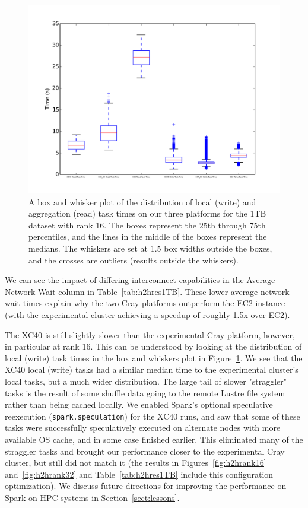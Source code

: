    \begin{figure} [H]
    \begin{centering}
    \includegraphics[scale=0.4]{images/boxplot_read_write_task_Rank_16_1T_default_partitions.pdf}
    \end{centering}
    \caption{A box and whisker plot of the distribution of local (write) and aggregation (read) task times on our three platforms for the 1TB dataset with rank 16.  The boxes represent the 25th through 75th percentiles, and the lines in the middle of the boxes represent the medians.  The whiskers are set at 1.5 box widths outside the boxes, and the crosses are outliers (results outside the whiskers).}
    \label{fig:rwtaskdist} 
    \end{figure}

We can see the impact of differing interconnect capabilities in the Average Network Wait column in Table~\ref{tab:h2hres1TB}.   These lower average network wait times explain why the two Cray platforms outperform the EC2 instance (with the experimental cluster achieving a speedup of roughly 1.5x over EC2).  

The XC40 is still slightly slower than the experimental Cray platform, however, in particular at rank 16.  This can be understood by looking at the distribution of local (write) task times in the box and whiskers plot in Figure~\ref{fig:rwtaskdist}.  We see that the XC40 local (write) tasks had a similar median time to the experimental cluster's local tasks, but a much wider distribution.  The large tail of slower "straggler" tasks is the result of some shuffle data going to the remote Lustre file system rather than being cached locally. We enabled Spark's optional speculative reexecution (\texttt{spark.speculation}) for the XC40 runs, and saw that some of these tasks were successfully speculatively executed on alternate nodes with more available OS cache, and in some case finished earlier.  This eliminated many of the straggler tasks and brought our performance closer to the experimental Cray cluster, but still did not match it (the results in Figures~\ref{fig:h2hrank16} and~\ref{fig:h2hrank32} and Table~\ref{tab:h2hres1TB} include this configuration optimization).  We discuss future directions for improving the performance on Spark on HPC systems in Section~\ref{sect:lessons}.
